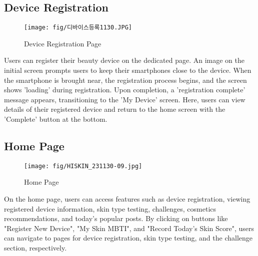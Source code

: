 \documentclass[conference]{IEEEtran}
\begin{document}
\subsection{Device Registration}
\begin{figure}[h]
    \centering
    \texttt{[image: fig/디바이스등록1130.JPG]}
    \label{fig:Device Registration Page}
    \caption{Device Registration Page} 
    \end{figure}
Users can register their beauty device on the dedicated page. An image on the initial screen prompts users to keep their smartphones close to the device. When the smartphone is brought near, the registration process begins, and the screen shows 'loading' during registration. Upon completion, a 'registration complete' message appears, transitioning to the 'My Device' screen. Here, users can view details of their registered device and return to the home screen with the 'Complete' button at the bottom. \\

\subsection{Home Page}
\begin{figure}[h]
    \centering
    \texttt{[image: fig/HISKIN\_231130-09.jpg]}
    \label{fig:Home Page}
    \caption{Home Page} 
    \end{figure}
On the home page, users can access features such as device registration, viewing registered device information, skin type testing, challenges, cosmetics recommendations, and today's popular posts. By clicking on buttons like "Register New Device", "My Skin MBTI", and "Record Today's Skin Score", users can navigate to pages for device registration, skin type testing, and the challenge section, respectively.\\ 
\end{document}
